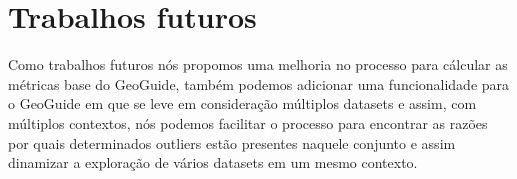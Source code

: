 \section{Trabalhos futuros}

Como trabalhos futuros nós propomos uma melhoria no processo para cálcular as métricas base do GeoGuide, também podemos adicionar uma funcionalidade para o GeoGuide em que se leve em consideração múltiplos datasets e assim, com múltiplos contextos, nós podemos facilitar o processo para encontrar as razões por quais determinados outliers estão presentes naquele conjunto e assim dinamizar a exploração de vários datasets em um mesmo contexto. 